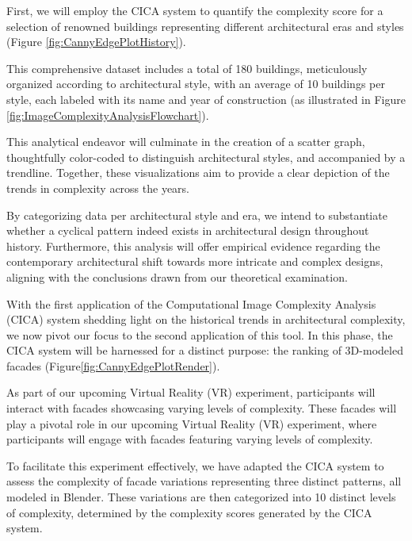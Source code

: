 First, we will employ the CICA system to quantify the complexity score for a selection of renowned buildings representing different architectural eras and styles (Figure \ref{fig:CannyEdgePlotHistory}).

This comprehensive dataset includes a total of 180 buildings, meticulously organized according to architectural style, with an average of 10 buildings per style, each labeled with its name and year of construction (as illustrated in Figure \ref{fig:ImageComplexityAnalysisFlowchart}).

This analytical endeavor will culminate in the creation of a scatter graph, thoughtfully color-coded to distinguish architectural styles, and accompanied by a trendline.
Together, these visualizations aim to provide a clear depiction of the trends in complexity across the years.

By categorizing data per architectural style and era, we intend to substantiate whether a cyclical pattern indeed exists in architectural design throughout history.
Furthermore, this analysis will offer empirical evidence regarding the contemporary architectural shift towards more intricate and complex designs, aligning with the conclusions drawn from our theoretical examination.


With the first application of the Computational Image Complexity Analysis (CICA) system shedding light on the historical trends in architectural complexity, we now pivot our focus to the second application of this tool.
In this phase, the CICA system will be harnessed for a distinct purpose: the ranking of 3D-modeled facades (Figure\ref{fig:CannyEdgePlotRender}).

As part of our upcoming Virtual Reality (VR) experiment, participants will interact with facades showcasing varying levels of complexity.
These facades will play a pivotal role in our upcoming Virtual Reality (VR) experiment, where participants will engage with facades featuring varying levels of complexity.

To facilitate this experiment effectively, we have adapted the CICA system to assess the complexity of facade variations representing three distinct patterns, all modeled in Blender.
These variations are then categorized into 10 distinct levels of complexity, determined by the complexity scores generated by the CICA system.

